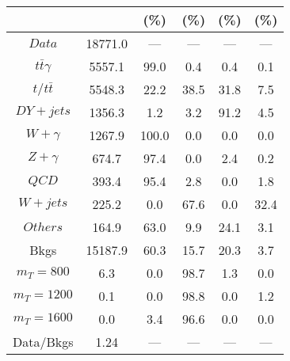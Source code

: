 \begin{figure}
\begin{minipage}[c]{0.32\textwidth}
{\begin{tabular}{cccccc}
 &  & (\%) & (\%) & (\%) & (\%)  \\
\hline
                                                                      $ Data $ &  18771.0 &  --- &  --- &  --- &  ---\\
$ t\bar{t}\gamma $ &  5557.1 &  99.0 &  0.4 &  0.4 &  0.1\\
$ t/t\bar{t} $ &  5548.3 &  22.2 &  38.5 &  31.8 &  7.5\\
$ DY+jets $ &  1356.3 &  1.2 &  3.2 &  91.2 &  4.5\\
$ W+\gamma $ &  1267.9 &  100.0 &  0.0 &  0.0 &  0.0\\
$ Z+\gamma $ &  674.7 &  97.4 &  0.0 &  2.4 &  0.2\\
$ QCD $ &  393.4 &  95.4 &  2.8 &  0.0 &  1.8\\
$ W+jets $ &  225.2 &  0.0 &  67.6 &  0.0 &  32.4\\
$ Others $ &  164.9 &  63.0 &  9.9 &  24.1 &  3.1\\
Bkgs &  15187.9 &  60.3 &  15.7 &  20.3 &  3.7\\
$ m_{T} = 800 $ &  6.3 &  0.0 &  98.7 &  1.3 &  0.0\\
$ m_{T} = 1200 $ &  0.1 &  0.0 &  98.8 &  0.0 &  1.2\\
$ m_{T} = 1600 $ &  0.0 &  3.4 &  96.6 &  0.0 &  0.0\\
Data/Bkgs &  1.24 &  --- &  --- &  --- &  ---\\
\hline
\end{tabular}
}
\end{minipage}
\end{figure}

